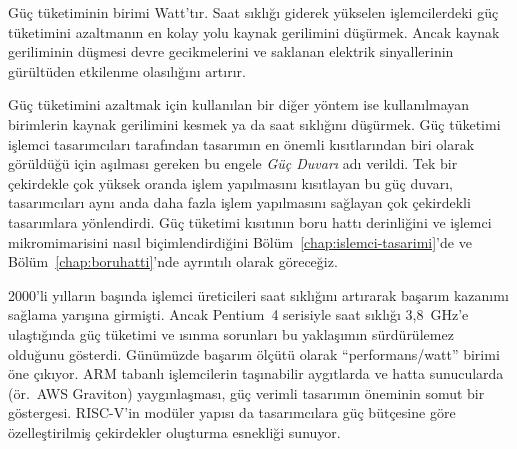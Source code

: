 Güç tüketiminin birimi Watt'tır. Saat sıklığı giderek yükselen işlemcilerdeki güç tüketimini azaltmanın en kolay yolu kaynak gerilimini düşürmek. Ancak kaynak geriliminin düşmesi devre gecikmelerini ve saklanan elektrik sinyallerinin gürültüden etkilenme olasılığını artırır.

Güç tüketimini azaltmak için kullanılan bir diğer yöntem ise kullanılmayan birimlerin kaynak gerilimini kesmek ya da saat sıklığını düşürmek. Güç tüketimi işlemci tasarımcıları tarafından tasarımın en önemli kısıtlarından biri olarak görüldüğü için aşılması gereken bu engele \emph{Güç Duvarı} adı verildi. Tek bir çekirdekle çok yüksek oranda işlem yapılmasını kısıtlayan bu güç duvarı, tasarımcıları aynı anda daha fazla işlem yapılmasını sağlayan çok çekirdekli tasarımlara yönlendirdi. Güç tüketimi kısıtının boru hattı derinliğini ve işlemci mikromimarisini nasıl biçimlendirdiğini Bölüm~\ref{chap:islemci-tasarimi}'de ve Bölüm~\ref{chap:boruhatti}'nde ayrıntılı olarak göreceğiz.

\begin{bilginot}
2000'li yılların başında işlemci üreticileri saat sıklığını artırarak başarım kazanımı sağlama yarışına girmişti. Ancak Pentium~4 serisiyle saat sıklığı 3{,}8~GHz'e ulaştığında güç tüketimi ve ısınma sorunları bu yaklaşımın sürdürülemez olduğunu gösterdi. Günümüzde başarım ölçütü olarak ``performans/watt'' birimi öne çıkıyor. ARM tabanlı işlemcilerin taşınabilir aygıtlarda ve hatta sunucularda (ör.\ AWS Graviton) yaygınlaşması, güç verimli tasarımın öneminin somut bir göstergesi. RISC-V'in modüler yapısı da tasarımcılara güç bütçesine göre özelleştirilmiş çekirdekler oluşturma esnekliği sunuyor.
\end{bilginot}

